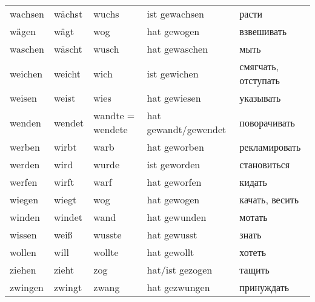 \begin{longtable}{|l|l|l|l|l|}
wachsen & w\"achst & wuchs & ist gewachsen & расти \\
w\"agen & w\"agt & wog & hat gewogen & взвешивать \\
waschen & w\"ascht & wusch & hat gewaschen & мыть \\
weichen & weicht & wich & ist gewichen & смягчать, отступать \\
weisen & weist & wies & hat gewiesen & указывать \\
wenden & wendet & wandte = wendete & hat gewandt/gewendet & поворачивать \\
werben & wirbt & warb & hat geworben & рекламировать \\
werden & wird & wurde & ist geworden & становиться \\
werfen & wirft & warf & hat geworfen & кидать \\
wiegen & wiegt & wog & hat gewogen & качать, весить \\
winden & windet & wand & hat gewunden & мотать \\
wissen & wei\ss  & wusste & hat gewusst & знать \\
wollen & will & wollte & hat gewollt & хотеть \\
ziehen & zieht & zog & hat/ist gezogen & тащить \\
zwingen & zwingt & zwang & hat gezwungen & принуждать \\
\hline
\end{longtable}
